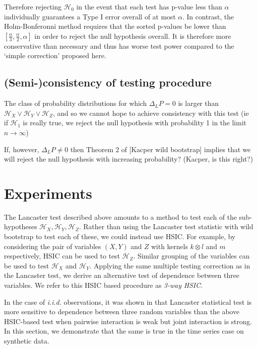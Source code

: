 \documentclass[]{article}
\begin{document}
Therefore rejecting $\mathcal{H}_0$ in the event that each test has p-value less than $\alpha$ individually guarantees a Type I error overall of at most $\alpha$. In contrast, the Holm-Bonferonni method requires that the sorted p-values be lower than $[\frac{\alpha}{3},\frac{\alpha}{2},\alpha]$ in order to reject the null hypothesis overall. It is therefore more conservative than necessary and thus has worse test power compared to the `simple correction' proposed here.


\subsection{(Semi-)consistency of testing procedure}

The class of probability distributions for which $\Delta_LP=0$ is larger than $\mathcal{H}_X \lor \mathcal{H}_Y \lor\mathcal{H}_Z$, and so we cannot hope to achieve consistency with this test (ie if $\mathcal{H}_1$ is really true, we reject the null hypothesis with probability 1 in the limit $n\longrightarrow\infty$)

If, however, $\Delta_LP \not =0$ then Theorem 2 of [Kacper wild bootstrap] implies that we will reject the null hypothesis with increasing probability? (Kacper, is this right?)



\section{Experiments}

The Lancaster test described above amounts to a method to test each of the sub-hypotheses $\mathcal{H}_X, \mathcal{H}_Y, \mathcal{H}_Z$. Rather than using the Lancaster test statistic with wild bootstrap to test each of these, we could instead use HSIC. For example, by considering the pair of variables $(X,Y)$ and $Z$ with kernels $k\otimes l$ and $m$ respectively, HSIC can be used to test $\mathcal{H}_Z$. Similar grouping of the variables can be used to test $\mathcal{H}_X$ and $\mathcal{H}_Y$. Applying the same multiple testing correction as in the Lancaster test, we derive an alternative test of dependence between three variables. We refer to this HSIC based procedure as \emph{3-way HSIC}.

In the case of \emph{i.i.d.} observations, it was shown in \cite{sejdinovic2013kernel} that Lancaster statistical test is more sensitive to dependence between three random variables than the above HSIC-based test when pairwise interaction is weak but joint interaction is strong. In this section, we demonstrate that the same is true in the time series case on synthetic data.
\end{document}
